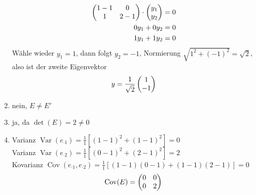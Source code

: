 \documentclass{article}
\DeclareMathOperator{\Var}{Var}
\DeclareMathOperator{\Cov}{Cov}
\begin{document}
\begin{enumerate}[label=(\alph*)]
\begin{align}
			\begin{pmatrix}
				1-1 & 0 \\ 1 & 2-1
			\end{pmatrix} \cdot \begin{pmatrix}
				y_1 \\ y_2
			\end{pmatrix} &= 0 \notag \\
			0y_1+0y_2 &= 0 \notag \\
			1y_1+1y_2 &= 0 \notag
		\end{align}
		Wähle wieder $y_1=1$, dann folgt $y_2=-1$, Normierung $\sqrt{1^2+(-1)^2}=\sqrt{2}$, also ist der zweite Eigenvektor
		\begin{align}
			y= \frac{1}{\sqrt{2}}\begin{pmatrix}
				1 \\ -1
			\end{pmatrix} \notag
		\end{align}
		\item nein, $E\neq E'$
		\item ja, da $\det(E)=2\neq 0$
		\item Varianz $\Var(e_{\cdot1}) = \frac{1}{1}[(1-1)^2 + (1-1)^2] = 0$ \\
		Varianz $\Var(e_{\cdot2}) = \frac{1}{1}[(0-1)^2 + (2-1)^2] = 2$ \\
		Kovarianz $\Cov(e_{\cdot1},e_{\cdot 2}) = \frac{1}{1}[(1-1)(0-1) + (1-1)(2-1)] = 0$
		\begin{align}
			\Cov(E) = \begin{pmatrix}
				0 & 0 \\ 0 & 2
			\end{pmatrix} \notag
		\end{align}
	\end{enumerate}
	
	
\end{document}
